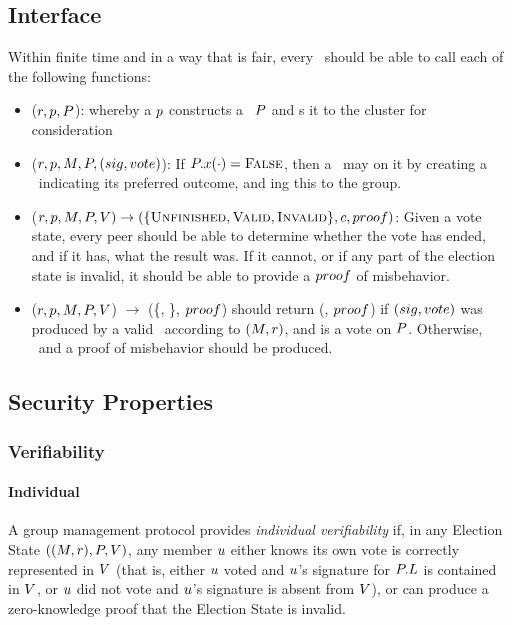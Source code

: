 \subsection{Interface}
Within finite time and in a way that is fair, every \KwPeer~should be able
to call each of the following functions:
\begin{itemize}
  \item \NamePropose($r, p, P$):
    whereby a \KwPeer $p$ constructs a \StructPetition~$P$ and
    \NameSend s it to the cluster for consideration
  \item \NameVote($r, p, M, P, (sig, vote)$): If
    $P.x(\cdot) = \textsc{False}$, then a \KwPeer~\peer may
    \NameVote on it by creating a \StructBallot~\Ballot indicating its preferred
    outcome, and \NameSend ing this to the group.
  \item \NameEvaluate($r, p, M, P, V) \to
    (\{\textsc{Unfinished}, \textsc{Valid}, \textsc{Invalid}\}, c, proof)$: Given a
    vote state, every peer should be able to determine whether the vote
    has ended, and if it has, what the result was. If it cannot, or if any part
    of the election state is invalid, it should be able to provide a $proof$
    of misbehavior.
  \item \NameEvaluate($r, p, M, P, V$)
    $\to$ (\{\AtomTrue, \AtomFalse\}, $proof$) should return (\AtomTrue,
    $proof$) if $(sig, vote)$ was produced by a valid \KwPeer~according to
    $(M, r)$, and is a vote on $P$. Otherwise, \AtomFalse~and a proof
    of misbehavior should be produced.
\end{itemize}

\subsection{Security Properties}
  \subsubsection{Verifiability}
  \paragraph{Individual}
  A group management protocol provides \emph{individual verifiability} if, in
  any Election State $((M, r), P, V)$, any member
  $u$ either knows its own vote is correctly represented in $V$
  (that is, either $u$ voted and $u$'s signature for
  $P.L$  is contained
  in $V$, or $u$ did not vote and $u$'s signature is
  absent from $V$), or can produce a zero-knowledge proof that the
  Election State is invalid.

